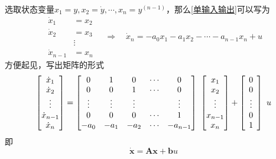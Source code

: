 选取状态变量$x_1 = y, x_2 = \dot{y}, \cdots, x_n = y^{(n-1)}$，那么\eqref{单输入输出}可以写为
\begin{equation}
	\begin{aligned}
		\dot{x}_1 &= x_2\\
		\dot{x}_2 &= x_3\\
		&\vdots\\
		\dot{x}_{n-1} &= x_n
	\end{aligned}
	\quad \Rightarrow \quad \dot{x}_n = -a_0x_1-a_1x_2-\cdots -a_{n-1}x_n+u
\end{equation}
方便起见，写出矩阵的形式
\begin{equation}
	\begin{bmatrix}
		 \dot{x}_1\\
		\dot{x}_2\\
		\hspace*{2mm}\vdots\hspace*{2mm}\\
		\dot{x}_{n-1}\\
		\dot{x}_n
	\end{bmatrix}
	=
	\begin{bmatrix}
		0 & 1 & 0 & \cdots & 0\\
		0 & 0 & 1 & \cdots & 0\\
		\vdots & \vdots & \vdots & & \vdots\\
		0 & 0 & 0 & \cdots & 1\\
		-a_0 & -a_1 & -a_2 & \cdots & -a_{n-1}
	\end{bmatrix}
	\,\,
	\begin{bmatrix}
		x_1\\
		x_2\\
		\hspace*{2mm}\vdots\hspace*{2mm}\\
		x_{n-1}\\
		x_{n}
	\end{bmatrix}
	+
	\begin{bmatrix}
		0\\
		0\\
	\hspace*{2mm}\vdots\hspace*{2mm}\\
		0\\
		1
	\end{bmatrix}
	\,\,
	u
\end{equation}
即
\begin{equation}
	\bm{\dot{x}}= \bm{A}\bm{x}+\bm{b}u
\end{equation}

